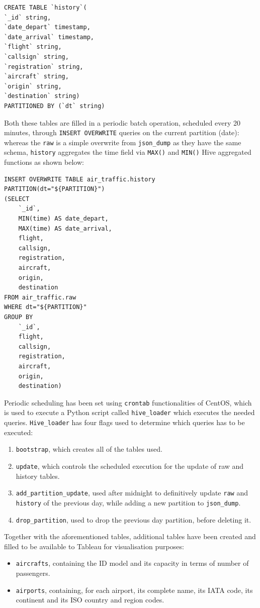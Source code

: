 \begin{verbatim}
CREATE TABLE `history`(
`_id` string, 
`date_depart` timestamp, 
`date_arrival` timestamp, 
`flight` string, 
`callsign` string, 
`registration` string, 
`aircraft` string, 
`origin` string, 
`destination` string)
PARTITIONED BY (`dt` string)
\end{verbatim}

Both these tables are filled in a periodic batch operation, scheduled every 20 minutes, through \texttt{INSERT OVERWRITE} queries on the current partition (date): whereas the \texttt{raw} is a simple overwrite from \texttt{json\_dump} as they have the same schema,  \texttt{history} aggregates the time field via \texttt{MAX()} and \texttt{MIN()} Hive aggregated functions as shown below:

\begin{verbatim}
INSERT OVERWRITE TABLE air_traffic.history 
PARTITION(dt="${PARTITION}")
(SELECT
    `_id`,
    MIN(time) AS date_depart,
    MAX(time) AS date_arrival,
    flight,
    callsign,
    registration,
    aircraft,
    origin,
    destination
FROM air_traffic.raw
WHERE dt="${PARTITION}"
GROUP BY 
    `_id`,
    flight,
    callsign,
    registration,
    aircraft,
    origin,
    destination)
\end{verbatim}

Periodic scheduling has been set using \texttt{crontab} functionalities of CentOS, which is used to execute a Python script called \texttt{hive\_loader} which executes the needed queries. \texttt{Hive\_loader} has four flags used to determine which queries has to be executed:
\begin{enumerate}
    \item \texttt{bootstrap}, which creates all of the tables used.
    \item \texttt{update}, which controls the scheduled execution for the update of raw and history tables.
    \item \texttt{add\_partition\_update}, used after midnight to definitively update \texttt{raw} and \texttt{history} of the previous day, while adding a new partition to \texttt{json\_dump}.
    \item \texttt{drop\_partition}, used to drop the previous day partition, before deleting it.
\end{enumerate}

Together with the aforementioned tables, additional tables have been created and filled to be available to Tableau for visualisation purposes:

\begin{itemize}
    \item \texttt{aircrafts}, containing the ID model and its capacity in terms of number of passengers.
    \item \texttt{airports}, containing, for each airport, its complete name, its IATA code, its continent and its ISO country and region codes.
\end{itemize}